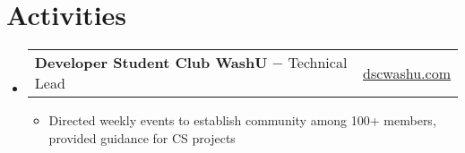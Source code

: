 \documentclass[11pt]{article} %
\makeatletter
\newcommand{\BeginSubsectionList}{\begin{itemize}[leftmargin=0pt,label={}]}
\newcommand{\EndSubsectionList}{\end{itemize}}
\newcommand{\Bullet}[1]{\item{#1 \vspace{-2pt}}}
\newcommand{\BeginBulletList}{\begin{itemize}[leftmargin=12pt]}
\newcommand{\EndBulletList}{\end{itemize}\vspace{0pt}}
\newcommand{\NewProject}[3]{
    \vspace{-10pt}
    \item
    \begin{tabular*}{\textwidth}{l@{\extracolsep{\fill}} r}
      \textbf{#1} {#2} & {#3} \\
    \end{tabular*}
    
    \vspace{-10pt}
}
\makeatother
\begin{document}
\vspace{-19pt}
\section{Activities}
\BeginSubsectionList        
    \NewProject
    {Developer Student Club WashU}
    {$-$ Technical Lead}
    {\href{https://www.dscwashu.com/}{dscwashu.com}} 

    \BeginBulletList
        \Bullet{Directed weekly events to establish community among 100+ members, provided guidance for CS projects}
    \EndBulletList
\EndSubsectionList
\end{document}
